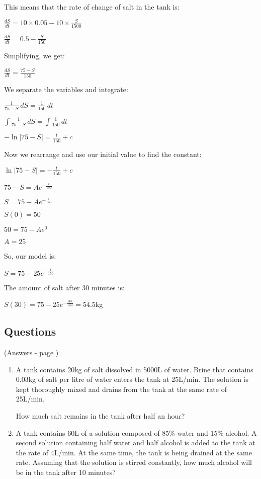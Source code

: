 \documentclass[../main.tex]{subfiles}
\begin{document}
This means that the rate of change of salt in the tank is:

$\frac{dS}{dt}=10 \times 0.05 - 10 \times \frac{S}{1500}$

$\frac{dS}{dt}=0.5 - \frac{S}{150}$

Simplifying, we get:

$\frac{dS}{dt}=\frac{75-S}{150}$

We separate the variables and integrate:

$\frac{1}{75-S}\,dS=\frac{1}{150}\,dt$

$\int \frac{1}{75-S}\,dS=\int \frac{1}{150}\,dt$

$-\ln|75-S|=\frac{t}{150}+c$

Now we rearrange and use our initial value to find the constant:

$\ln|75-S|=-\frac{t}{150}+c$

$75-S=Ae^{-\frac{t}{150}}$

$S=75-Ae^{-\frac{t}{150}}$

$S(0)=50$

$50=75-Ae^{0}$

$A=25$

So, our model is:

$S=75-25e^{-\frac{t}{150}}$

The amount of salt after 30 minutes is:

$S(30)=75-25e^{-\frac{30}{150}}=54.5$kg

\pagebreak
\hypertarget{mixinglink}{\subsection*{Questions}}
\hyperlink{mixinganswers}{(Answers - page {\pageref*{Mixing problems answers}})}

\label{Mixing problems}
\begin{enumerate}[itemsep=0.7cm]
    \item 
    A tank contains 20kg of salt dissolved in 5000L of water. Brine that contains 0.03kg of salt per litre of water enters the tank at 25L/min. The solution is kept thoroughly mixed and drains from the tank at the same rate of 25L/min. 
    
    How much salt remains in the tank after half an hour?

    \item
    A tank contains 60L of a solution composed of 85$\%$ water and 15$\%$ alcohol. A second solution containing half water and half alcohol is added to the tank at the rate of 4L/min. At the same time, the tank is being drained at the same rate.
    Assuming that the solution is stirred constantly, how much alcohol will be in the tank after 10 minutes?

\end{enumerate}
\end{document}

